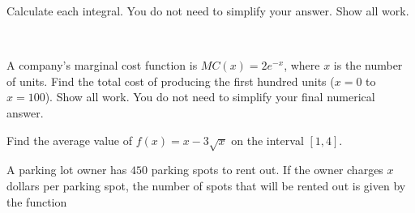 \documentclass[addpoints,12pt]{exam}
\newcommand{\ds}{\displaystyle}
\begin{document}
\begin{questions}

\newpage


\question
Calculate each integral. You do not need to simplify your answer. Show all work.
​

\newpage

\question[9] A company's marginal cost function is $MC(x)=2e^{-x}$, where $x$ is the number of
units. Find the total cost of producing the first hundred units ($x=0$ to $x=100$). Show all work.
You do not need to simplify your final numerical answer.
​

\newpage

\question[7] Find the average value of $f(x)=x-3\sqrt{x}$ on the interval $[1,4]$.


\newpage

\question A parking lot owner has $450$ parking spots to rent out. If the owner charges $x$
dollars per parking spot, the number of spots that
will be rented out is given by the function


\end{questions}
\end{document}

